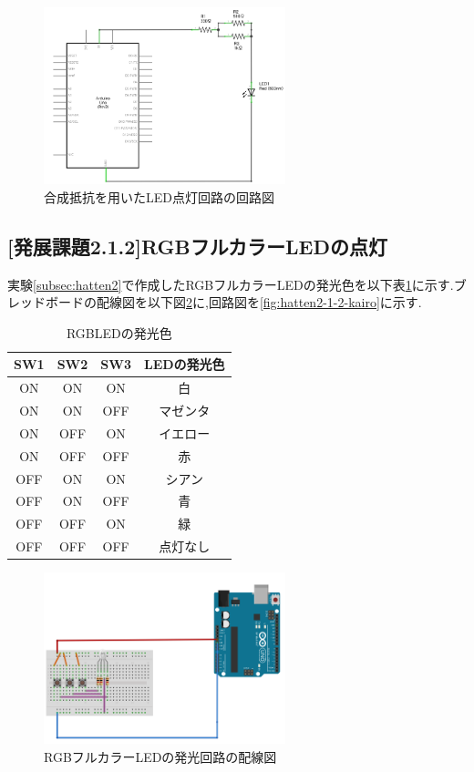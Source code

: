 \documentclass{jarticle}
\begin{document}
\begin{figure}[H]
\begin{center}
\includegraphics[width=7.0cm]{images/hatten2-1-1_回路図.png}
\caption{合成抵抗を用いたLED点灯回路の回路図}
\label{fig:hatten2-1-1-kairo}
\end{center}
\end{figure}

\subsection{[発展課題2.1.2]RGBフルカラーLEDの点灯}
実験\ref{subsec:hatten2}で作成したRGBフルカラーLEDの発光色を以下表\ref{table:rgbled}に示す.ブレッドボードの配線図を以下図\ref{fig:hatten2-1-2-bread}に,回路図を\ref{fig:hatten2-1-2-kairo}に示す.

\begin{table}[H]
\centering
\caption{RGBLEDの発光色}
\label{table:rgbled}
\begin{center}
\begin{tabular}{c|c|c|c}
\hline \hline
SW1 & SW2 & SW3&LEDの発光色\\ \hline
ON&ON&ON&白\\
ON&ON&OFF&マゼンタ\\
ON&OFF&ON&イエロー\\
ON&OFF&OFF&赤\\
OFF&ON&ON&シアン\\
OFF&ON&OFF&青\\
OFF&OFF&ON&緑\\
OFF&OFF&OFF&点灯なし\\ \hline
\end{tabular}
\end{center}
\end{table}

\begin{figure}[H]
\begin{center}
\includegraphics[width=7.0cm]{images/hatten2-1-2_ブレッドボード.png}
\caption{RGBフルカラーLEDの発光回路の配線図}
\label{fig:hatten2-1-2-bread}
\end{center}
\end{figure}
\end{document}
